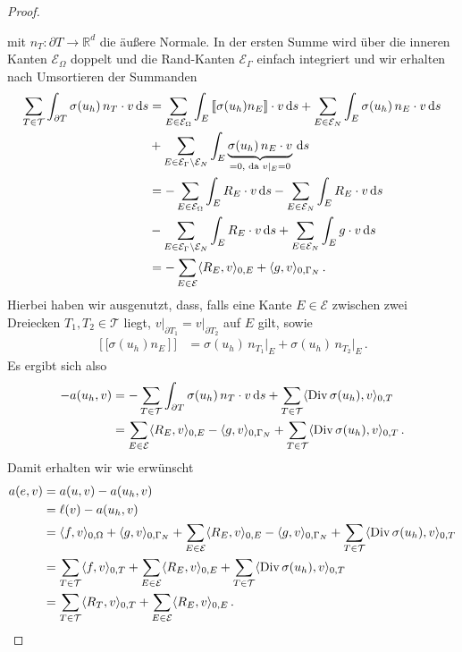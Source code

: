 \documentclass{scrartcl}
\def\R{\mathbb{R}}
\newcommand{\cE}{\mathcal{E}}
\newcommand{\cT}{\mathcal{T}}
\newcommand{\dif}[1]{\,\mathrm{d} #1}
\DeclareMathOperator{\diver}{Div}			%
\DeclarePairedDelimiter{\inner}{\langle}{\rangle}
\begin{document}
\begin{proof}
\begin{samepage}
\begin{tikzpicture}[remember picture, overlay, node distance = 0.6cm]
	\end{tikzpicture}%
	\end{samepage}%
	mit $n_T\colon\partial T\to\R^d$ die äußere Normale.
	In der ersten Summe wird über die inneren Kanten $\cE_\Omega$ doppelt und die Rand-Kanten $\cE_\Gamma$ einfach integriert und wir erhalten nach Umsortieren der Summanden
	\begin{align*}
		\sum_{T\in\cT}\int_{\partial T}\sigma(u_h)\, n_T\cdot v\dif s
		&= \sum_{E\in\cE_\Omega}\int_{E}\left[\![\sigma(u_h) n_E\right]\!]\cdot v\dif s
		+\sum_{E\in\cE_N}\int_{E}\sigma(u_h)\, n_E\cdot v\dif s		\\
		&+\sum_{E\in\cE_\Gamma\setminus\cE_N}\int_{E}\underbrace{\sigma(u_h)\, n_E\cdot v}_{=0,\text{ da }v\vert_E = 0}\dif s \\
		&= -\sum_{E\in\cE_\Omega}\int_{E}R_E\cdot v\dif s
		-\sum_{E\in\cE_N}\int_{E}R_E\cdot v\dif s \\
		&-\sum_{E\in\cE_\Gamma\setminus\cE_N}\int_{E}R_E\cdot v\dif s 
		+\sum_{E\in\cE_N}\int_Eg\cdot v\dif s		\\
		&= -\sum_{E\in\cE}\inner{R_E,v}_{0,E}+\inner{g,v}_{0,\Gamma_N}\,.
	\end{align*}
	Hierbei haben wir ausgenutzt, dass, falls eine Kante $E\in\cE$ zwischen zwei Dreiecken $T_1,T_2\in\cT$ liegt, $v\big\vert_{\partial T_1} = v\big\vert_{\partial T_2}$ auf $E$ gilt, sowie
	\begin{align*}
		\left[\![\sigma(u_h) n_E\right]\!]
		&=\sigma(u_h) \,n_{T_1}\big\vert_{E}+\sigma(u_h)\, n_{T_2} \big\vert_{E}\,.
	\end{align*}
	Es ergibt sich also
	\begin{align*}
		-a(u_h,v)
		&= -\sum_{T\in\cT}\int_{\partial T}\sigma(u_h)\, n_T\cdot v\dif s+\sum_{T\in\cT}\inner{\diver \sigma(u_h),v}_{0,T} \\
		&= \sum_{E\in\cE}\inner{R_E,v}_{0,E}-\inner{g,v}_{0,\Gamma_N}+\sum_{T\in\cT}\inner{\diver \sigma(u_h),v}_{0,T}\,.
	\end{align*}
	Damit erhalten wir wie erwünscht
	\begin{align*}
		a(e,v)
		&= a(u,v)-a(u_h,v) \\
		&= \ell(v)-a(u_h,v) \\
		&= \inner{f,v}_{0,\Omega}+\inner{g,v}_{0,\Gamma_N}+\sum_{E\in\cE}\inner{R_E,v}_{0,E}-\inner{g,v}_{0,\Gamma_N}+\sum_{T\in\cT}\inner{\diver \sigma(u_h),v}_{0,T} \\
		&= \sum_{T\in\cT}\inner{f,v}_{0,T}+\sum_{E\in\cE}\inner{R_E,v}_{0,E}+\sum_{T\in\cT}\inner{\diver \sigma(u_h),v}_{0,T} \\
		&= \sum_{T\in\cT}\inner{R_T,v}_{0,T}+\sum_{E\in\cE}\inner{R_E,v}_{0,E}\,.
	\end{align*}
\end{proof}
\end{document}
